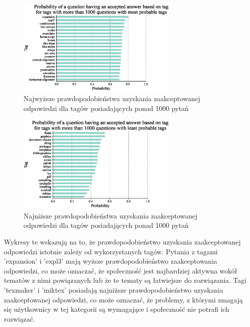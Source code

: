 \documentclass[12pt]{article}
\begin{document}
	\begin{figure}[H]
		\centering
		\includegraphics[width=0.7\textwidth]{tags_top}
		\caption{Najwyższe prawdopodobieństwa uzyskania zaakceptowanej odpowiedzi dla tagów posiadających ponad 1000 pytań}
		\label{fig:najwyzsze-prawdopodobienstwa-uzyskania-odpowiedzi-tagi}
	\end{figure}
	\begin{figure}[H]
		\centering
		\includegraphics[width=0.7\textwidth]{tags_bottom}
		\caption{Najniższe prawdopodobieństwa uzyskania zaakceptowanej odpowiedzi dla tagów posiadających ponad 1000 pytań}
		\label{fig:najnizsze-prawdopodobienstwa-uzyskania-odpowiedzi-tagi}
	\end{figure}
	Wykresy te wskazują na to, że prawdopodobieństwo uzyskania zaakceptowanej odpowiedzi istotnie zależy od wykorzystanych tagów. Pytania z tagami  'expansion' i 'expl3' mają wyższe prawdopodobieństwo zaakceptowania odpowiedzi, co może oznaczać, że społeczność jest najbardziej aktywna wokół tematów z nimi powiązanych lub że te tematy są łatwiejsze do rozwiązania. Tagi 'texmaker' i 'miktex' posiadają najniższe prawdopodobieństwo uzyskania zaakceptowanej odpowiedzi, co może oznaczać, że problemy, z którymi zmagają się użytkownicy w tej kategorii są wymagające i społeczność nie potrafi ich rozwiązać.
	
\end{document}
